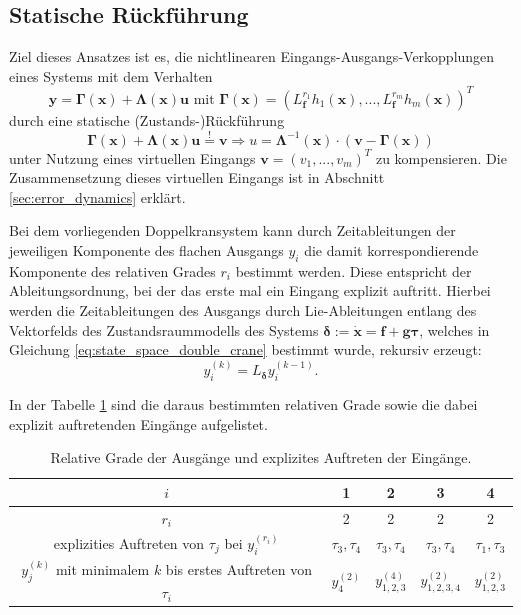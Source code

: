 \subsection{Statische Rückführung}
\label{sec:static_state_feedback}
Ziel dieses Ansatzes ist es, die nichtlinearen Eingangs-Ausgangs-Verkopplungen eines Systems mit dem Verhalten
\begin{equation}
	\mathbf{y} = \boldsymbol{\Gamma}(\mathbf{x}) + \boldsymbol{\Lambda}(\mathbf{x}) \boldsymbol{u} \text{ mit } \boldsymbol{\Gamma}(\mathbf{x}) = (L_{\mathbf{f}}^{r_1} h_1(\mathbf{x}), ..., L_{\mathbf{f}}^{r_m} h_m(\mathbf{x}))^T
\end{equation}
durch eine statische (Zustands-)Rückführung
\begin{equation}
	\label{eq:static_state_feedback}
	\boldsymbol{\Gamma}(\mathbf{x}) + \boldsymbol{\Lambda}(\mathbf{x}) \mathbf{u} \stackrel{!}{=} \mathbf{v} \Rightarrow u = \boldsymbol{\Lambda}^{-1}(\mathbf{x}) \cdot (\mathbf{v} - \boldsymbol{\Gamma}(\mathbf{x}))
\end{equation}
unter Nutzung eines virtuellen Eingangs $\mathbf{v} = (v_1, ..., v_m)^T$ zu kompensieren. Die Zusammensetzung dieses virtuellen Eingangs ist in Abschnitt \ref{sec:error_dynamics} erklärt. \cite[S. 195]{NLRT_Roebenack}

Bei dem vorliegenden Doppelkransystem kann durch Zeitableitungen der jeweiligen Komponente des flachen Ausgangs $y_i$ die damit korrespondierende Komponente des relativen Grades $r_i$ bestimmt werden. Diese entspricht der Ableitungsordnung, bei der das erste mal ein Eingang explizit auftritt. Hierbei werden die Zeitableitungen des Ausgangs durch Lie-Ableitungen entlang des Vektorfelds des Zustandsraummodells des Systems $\boldsymbol{\delta} := \dot{\mathbf{x}} = \mathbf{f} + \mathbf{g} \boldsymbol{\tau}$, welches in Gleichung \eqref{eq:state_space_double_crane} bestimmt wurde, rekursiv erzeugt: 
\begin{equation}
	\label{eq:Lie_time_deriv}
	y_i^{(k)} = L_{\boldsymbol{\delta}} y_i^{(k-1)} .
\end{equation}

In der Tabelle \ref{tab:relative_degrees} sind die daraus bestimmten relativen Grade sowie die dabei explizit auftretenden Eingänge aufgelistet.
\begin{table}[htbp]%
	\centering
	\caption{Relative Grade der Ausgänge und explizites Auftreten der Eingänge.}
	\label{tab:relative_degrees}
	\begin{tabular}{c| c c c c} 
		$i$ & 1 & 2 & 3 & 4 \\ 
		\hline
		$r_i$ & 2 & 2 & 2 & 2\\ 
		\hline
		explizities Auftreten von $\tau_j$ bei $y_i^{(r_i)}$ & $\tau_3, \tau_4$ & $\tau_3, \tau_4$ & $\tau_3, \tau_4$ & $\tau_1, \tau_3$ \\
		\hline
		$y_j^{(k)}$ mit minimalem $k$ bis erstes Auftreten von $\tau_i$ & $y_4^{(2)}$ & $y_{1,2,3}^{(4)}$ & $y_{1,2,3,4}^{(2)}$ & $y_{1,2,3}^{(2)}$\\
		\bottomrule
	\end{tabular}
\end{table}

